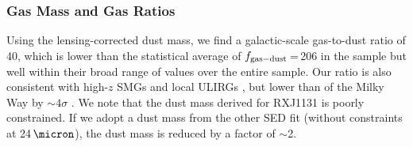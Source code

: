 \documentclass[]{emulateapj}
\begin{document}

\subsubsection{Gas Mass and Gas Ratios}
%
Using the lensing-corrected dust mass, we find a galactic-scale gas-to-dust ratio of
40, which is lower than the statistical average of $f_{\rm gas-dust}$\,=\,206
in the  sample but well within their broad 
range of values over the entire sample. Our ratio is also consistent with 
high-$z$ SMGs 
\citep[hereafter B13]{Bothwell13a} and
local ULIRGs \citep{Wilson08a}, but lower than of the Milky Way by
$\sim 4\sigma$ \citep[ignoring systematic uncertainties;][]{Li01a,Zubko04a,Draine07a}.
We note that the dust mass derived for RXJ1131 is poorly constrained.
If we adopt a dust mass from the other SED fit (\ie without constraints at 24\,$\micron$),
the dust mass is reduced by a factor of $\sim$2. 
\end{document}
